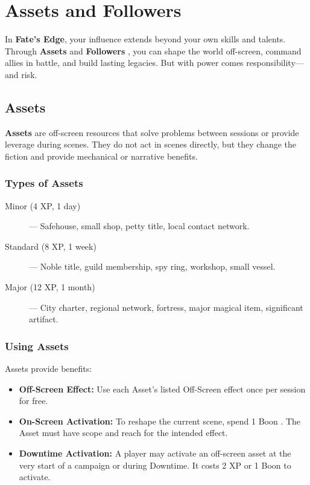 
\chapter{Assets and Followers}
\label{ch:assets-followers}

In \textbf{Fate's Edge}, your influence extends beyond your own skills and talents. Through \textbf{Assets}  and \textbf{Followers} , you can shape the world off-screen, command allies in battle, and build lasting legacies. But with power comes responsibility—and risk.

\section{Assets}

\textbf{Assets} are off-screen resources that solve problems between sessions or provide leverage during scenes. They do not act in scenes directly, but they change the fiction and provide mechanical or narrative benefits.

\subsection*{Types of Assets}

\begin{description}
  \item[Minor (4 XP, 1 day)]  — Safehouse, small shop, petty title, local contact network.
  \item[Standard (8 XP, 1 week)]  — Noble title, guild membership, spy ring, workshop, small vessel.
  \item[Major (12 XP, 1 month)]  — City charter, regional network, fortress, major magical item, significant artifact.
\end{description}

\subsection*{Using Assets}

Assets provide benefits:

\begin{itemize}
  \item \textbf{Off-Screen Effect:} Use each Asset's listed Off-Screen effect once per session for free.
  \item \textbf{On-Screen Activation:} To reshape the current scene, spend 1 Boon . The Asset must have scope and reach for the intended effect.
  \item \textbf{Downtime Activation:} A player may activate an off-screen asset at the very start of a campaign or during Downtime. It costs 2 XP or 1 Boon to activate.
\end{itemize}

